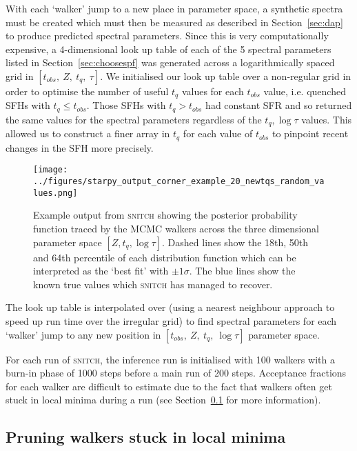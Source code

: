\documentclass[useAMS,usenatbib]{mn2e}
\begin{document}
With each `walker' jump to a new place in parameter space, a synthetic spectra must be created which must then be measured as described in Section~\ref{sec:dap} to produce predicted spectral parameters. Since this is very computationally expensive, a 4-dimensional look up table of each of the 5 spectral parameters listed in Section~\ref{sec:choosespf} was generated across a logarithmically spaced grid in $[t_{obs},~Z,~t_q,~\tau]$. We initialised our look up table over a non-regular grid in order to optimise the number of useful $t_q$ values for each $t_{obs}$ value, i.e. quenched SFHs with $t_q \leq t_{obs}$. Those SFHs with $t_q > t_{obs}$ had constant SFR and so returned the same values for the spectral parameters regardless of the $t_q, \log\tau$ values. This allowed us to construct a finer array in $t_q$ for each value of $t_{obs}$ to pinpoint recent changes in the SFH more precisely. 


\begin{figure*}
\centering
\texttt{[image: ../figures/starpy\_output\_corner\_example\_20\_newtqs\_random\_values.png]}
\caption{Example output from \textsc{snitch} showing the posterior probability function traced by the MCMC walkers across the three dimensional parameter space $[Z, t_q, \log\tau]$. Dashed lines show the 18th, 50th and 64th percentile of each distribution function which can be interpreted as the `best fit' with $±1\sigma$. The blue lines show the known true values which \textsc{snitch} has managed to recover.}
\label{fig:output}
\end{figure*}
 
The look up table is interpolated over (using a nearest neighbour approach to speed up run time over the irregular grid) to find spectral parameters for each `walker' jump to any new position in $[t_{obs},~Z,~t_q,~\log\tau]$ parameter space. 

For each run of \textsc{snitch}, the inference run is initialised with 100 walkers with a burn-in phase of 1000 steps before a main run of 200 steps. Acceptance fractions for each walker are difficult to estimate due to the fact that walkers often get stuck in local minima during a run (see Section~\ref{sec:pruning} for more information). 



\subsection{Pruning walkers stuck in local minima}\label{sec:pruning}
\end{document}
